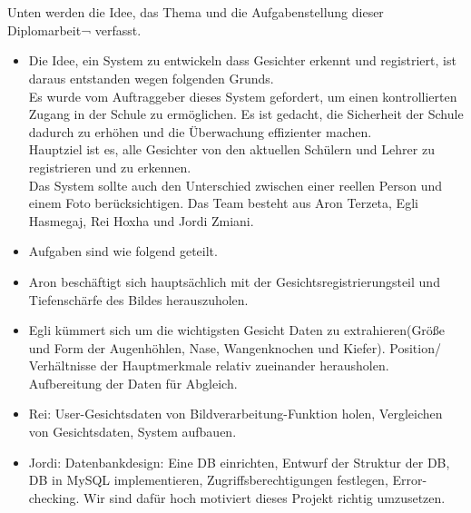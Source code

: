 \chapter{\docname}
\label{\docname}

\color{black}
Unten werden die Idee, das Thema und die Aufgabenstellung dieser Diplomarbeit¬ verfasst.

\begin{itemize}
	\item[] Die Idee, ein System zu entwickeln dass Gesichter erkennt und registriert, ist daraus entstanden wegen folgenden Grunds. \\
	Es wurde vom Auftraggeber dieses System gefordert, um einen kontrollierten Zugang in der Schule zu ermöglichen. Es ist gedacht, die Sicherheit der Schule dadurch zu erhöhen und die Überwachung effizienter machen. \\
	Hauptziel ist es, alle Gesichter von den aktuellen Schülern und Lehrer zu registrieren und zu erkennen. \\
	Das System sollte auch den Unterschied zwischen einer reellen Person und einem Foto berücksichtigen. 
	Das Team besteht aus Aron Terzeta, Egli Hasmegaj, Rei Hoxha und Jordi Zmiani. 
	
	\item[] Aufgaben sind wie folgend geteilt. 
	\item[] Aron beschäftigt sich hauptsächlich mit der Gesichtsregistrierungsteil und Tiefenschärfe des Bildes herauszuholen. 
	\item[] Egli kümmert sich um die wichtigsten Gesicht Daten zu extrahieren(Größe und Form der Augenhöhlen, Nase, Wangenknochen und Kiefer). Position/ Verhältnisse der Hauptmerkmale relativ zueinander herausholen.  Aufbereitung der Daten für Abgleich.
	\item[] Rei: User-Gesichtsdaten von Bildverarbeitung-Funktion holen, Vergleichen von Gesichtsdaten, System aufbauen.
	\item[] Jordi: Datenbankdesign: Eine DB einrichten, Entwurf der Struktur der DB, DB in MySQL implementieren, Zugriffsberechtigungen festlegen, Error-checking.
	Wir sind dafür hoch motiviert dieses  Projekt richtig umzusetzen. 
	
\end{itemize}

\color{black}
